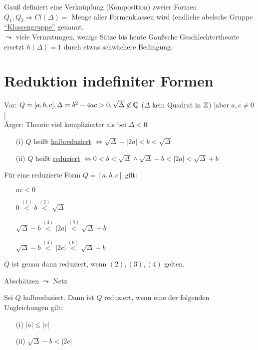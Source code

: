\documentclass[a4paper,DIV15,BCOR12mm]{article}
\begin{document}
Gauß definiert eine Verknüpfung (Komposition) zweier Formen $Q_1, Q_2 \Rightarrow Cl(\Delta) =$ Menge aller Formenklassen wird (endliche abelsche Gruppe \underline{"`Klassengruppe"'} genannt.\\
$\leadsto$ viele Vermutungen, wenige Sätze bis heute Gaußsche Geschlechtertheorie ersetzt $h(\Delta) = 1$ durch etwas schwächere Bedingung.

\section{Reduktion indefiniter Formen}

Vor: $Q = [a,b,c], \Delta = b^2 - 4ac > 0, \sqrt{\Delta} \not\in \mathbb{Q}$ ($\Delta$ kein Quadrat in $\mathbb{Z}$) [aber $a,c \not= 0$]\\
Ärger: Theorie viel komplizierter als bei $\Delta < 0$
\begin{definition}
\begin{itemize}
\item[(i)] $Q$ heißt \underline{halbreduziert} $\Leftrightarrow \sqrt{\Delta} - |2a| < b < \sqrt{\Delta}$
\item[(ii)] $Q$ heißt \underline{reduziert} $\Leftrightarrow 0 < b < \sqrt{\Delta} \wedge \sqrt{\Delta} - b < |2a| < \sqrt{\Delta} + b$
\end{itemize}
\end{definition}

\begin{satz}[Reduktionsungleichungen]
Für eine reduzierte Form $Q = [a,b,c]$ gilt:
\begin{itemize}
\item[] $ac < 0$
\item[] $0 \stackrel{(1)}{<} b \stackrel{(2)}{<} \sqrt{\Delta}$
\item[] $\sqrt{\Delta} - b \stackrel{(3)}{<} |2a| \stackrel{(5)}{<} \sqrt{\Delta} + b$
\item[] $\sqrt{\Delta} - b \stackrel{(4)}{<} |2c| \stackrel{(6)}{<} \sqrt{\Delta} + b$
\end{itemize}
$Q$ ist genau dann reduziert, wenn $(2), (3), (4)$ gelten.
\end{satz}

\begin{beweis}
Abschätzen $\leadsto$ Netz
\end{beweis}

\begin{folgerung}[Reduktionskriterium]
Sei $Q$ halbreduziert. Dann ist $Q$ reduziert, wenn eine der folgenden Ungleichungen gilt:
\begin{itemize}
\item[(i)] $|a| \le |c|$
\item[(ii)] $\sqrt{\Delta} - b < |2c|$
\end{itemize}
\end{folgerung}
\end{document}
